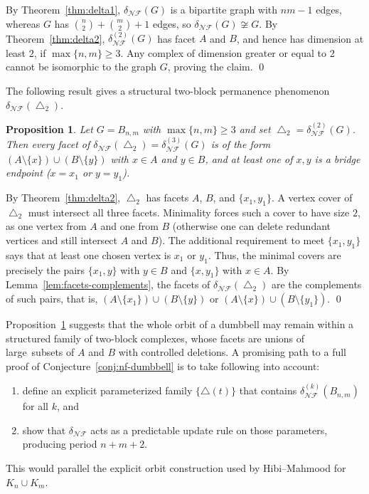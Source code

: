 \documentclass[12pt]{article}
\renewenvironment{proof}{{\noindent\bfseries Proof.}}{\qed}
\theoremstyle{plain}
\newtheorem{proposition}[theorem]{Proposition}
\theoremstyle{definition}
\newcommand{\A}{A}
\newcommand{\B}{B}
\begin{document}
	\begin{proof}
		By Theorem~\ref{thm:delta1}, $\delta_{\mathcal{NF}}(G)$ is a bipartite graph with $nm-1$ edges,
		whereas $G$ has $\binom{n}{2}+\binom{m}{2}+1$ edges, so $\delta_{\mathcal{NF}}(G)\not\cong G$.
		By Theorem~\ref{thm:delta2}, $\delta_{\mathcal{NF}}^{(2)}(G)$ has facet $\A$ and $\B$, and hence has dimension at least $2$, if $\max\{n,m\}\ge 3$.
		Any complex of dimension greater or equal to $2$ cannot be isomorphic to the graph $G$, proving the claim.
	\end{proof}
	
	\medskip
	The following  result gives a structural two-block permanence phenomenon $\delta_{\mathcal{NF}}(\bigtriangleup_2).$
	\begin{proposition}\label{prop:two-block}
		Let $G=B_{n,m}$ with $\max\{n,m\}\ge 3$ and set $\bigtriangleup_2=\delta_{\mathcal{NF}}^{(2)}(G)$.
		Then every facet of $\delta_{\mathcal{NF}}(\bigtriangleup_2)=\delta_{\mathcal{NF}}^{(3)}(G)$ is of the form $(\A\setminus\{x\}) \cup (\B\setminus\{y\})$ 
		with $x\in\A$ and $y\in\B$, and at least one of $x,y$ is a bridge endpoint ($x=x_1$ or $y=y_1$).
	\end{proposition}
	
	\begin{proof}
		By Theorem~\ref{thm:delta2}, $\bigtriangleup_2$ has facets $\A$, $\B$, and $\{x_1,y_1\}$.
		A vertex cover of $\bigtriangleup_2$ must intersect all three facets.
		Minimality forces such a cover to have size $2$, as one vertex from $\A$ and one from $\B$ (otherwise one can delete redundant vertices
		and still intersect $\A$ and $\B$). The additional requirement to meet $\{x_1,y_1\}$ says that at least one chosen vertex is $x_1$ or $y_1$.
		Thus, the minimal covers are precisely the pairs $\{x_1,y\}$ with $y\in\B$ and $\{x,y_1\}$ with $x\in\A$.
		By Lemma~\ref{lem:facets-complements}, the facets of $\delta_{\mathcal{NF}}(\bigtriangleup_2)$ are the complements of such pairs, that is,
		$(\A\setminus\{x_1\})\cup(\B\setminus\{y\})$ or $(\A\setminus\{x\})\cup(\B\setminus\{y_1\})$.
	\end{proof}
	
	\medskip
	
	
		Proposition~\ref{prop:two-block} suggests that the whole orbit of a dumbbell may remain within a structured family of two-block complexes, whose facets are unions of large subsets of $\A$ and $\B$ with controlled deletions.
		A promising path to a full proof of Conjecture~\ref{conj:nf-dumbbell} is to take following into account:
		\begin{enumerate}[leftmargin=2em]
			\item define an explicit parameterized family $\{\bigtriangleup(t)\}$ that contains $\delta_{\mathcal{NF}}^{(k)}(B_{n,m})$ for all $k$, and
			\item show that $\delta_{\mathcal{NF}}$ acts as a predictable update rule on those parameters, producing period $n+m+2$.
		\end{enumerate}
		This would parallel the explicit orbit construction used by Hibi--Mahmood \cite{HibiMahmood2020} for $K_n\cup K_m$.
	
\end{document}

